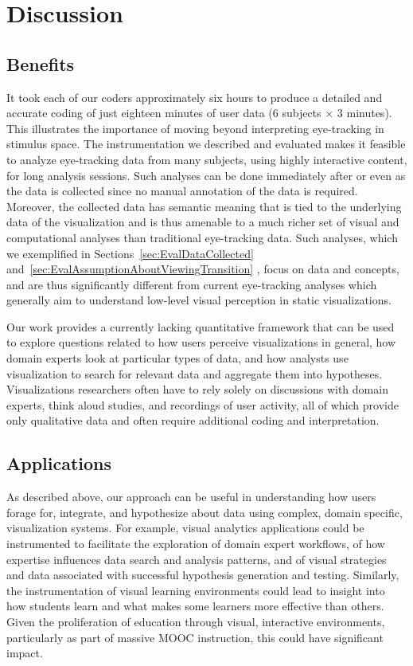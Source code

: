 ﻿\section{Discussion}
\label{sec:Discussion}
\subsection{Benefits}
\label{sec:Benefits}

It took each of our coders approximately six hours to produce a detailed and accurate coding of just eighteen minutes of user data ($6$ subjects $\times$ $3$ minutes). This illustrates the importance of moving beyond interpreting eye-tracking in stimulus space. The instrumentation we described and evaluated makes it feasible to analyze eye-tracking data from many subjects, using highly interactive content, for long analysis sessions. Such analyses can be done immediately after or even as the data is collected since no manual annotation of the data is required. 
Moreover, the collected data has semantic meaning that is tied to the underlying data of the visualization and is thus amenable to a much richer set of visual and computational analyses than traditional eye-tracking data. Such analyses, which we exemplified in Sections~\ref{sec:EvalDataCollected} and~\ref{sec:EvalAssumptionAboutViewingTransition} , focus on data and concepts, and are thus significantly different from current eye-tracking analyses which generally aim to understand low-level visual perception in static visualizations.

Our work provides a currently lacking quantitative framework that can be used to explore questions related to how users perceive visualizations in general, how domain experts look at particular types of data, and how analysts use visualization to search for relevant data and aggregate them into hypotheses. Visualizations researchers often have to rely solely on discussions with domain experts, think aloud studies, and recordings of user activity, all of which provide only qualitative data and often require additional coding and interpretation.


\subsection{Applications}
\label{sec:Applications}
As described above, our approach can be useful in understanding how users forage for, integrate, and hypothesize about data using complex, domain specific, visualization systems. For example, visual analytics applications could be instrumented to facilitate the exploration of domain expert workflows, of how expertise influences data search and analysis patterns, and of visual strategies and data associated with successful hypothesis generation and testing. Similarly, the instrumentation of visual learning environments could lead to insight into how students learn and what makes some learners more effective than others. Given the proliferation of education through visual, interactive environments, particularly as part of massive MOOC instruction, this could have significant impact. 

